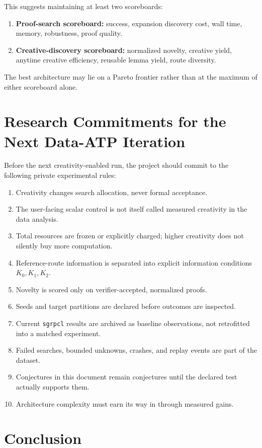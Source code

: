 \documentclass[11pt]{article}
\theoremstyle{datatheorem}
\theoremstyle{definition}
\begin{document}
This suggests maintaining at least two scoreboards:
\begin{enumerate}
\item \textbf{Proof-search scoreboard:} success, expansion discovery cost, wall time, memory, robustness, proof quality.
\item \textbf{Creative-discovery scoreboard:} normalized novelty, creative yield, anytime creative efficiency, reusable lemma yield, route diversity.
\end{enumerate}

The best architecture may lie on a Pareto frontier rather than at the maximum of either scoreboard alone.

\section{Research Commitments for the Next Data-ATP Iteration}

Before the next creativity-enabled run, the project should commit to the following private experimental rules:
\begin{enumerate}
\item Creativity changes search allocation, never formal acceptance.
\item The user-facing scalar control is not itself called measured creativity in the data analysis.
\item Total resources are frozen or explicitly charged; higher creativity does not silently buy more computation.
\item Reference-route information is separated into explicit information conditions $K_0,K_1,K_2$.
\item Novelty is scored only on verifier-accepted, normalized proofs.
\item Seeds and target partitions are declared before outcomes are inspected.
\item Current \texttt{sgrpcl} results are archived as baseline observations, not retrofitted into a matched experiment.
\item Failed searches, bounded unknowns, crashes, and replay events are part of the dataset.
\item Conjectures in this document remain conjectures until the declared test actually supports them.
\item Architecture complexity must earn its way in through measured gains.
\end{enumerate}

\section{Conclusion}
\end{document}
